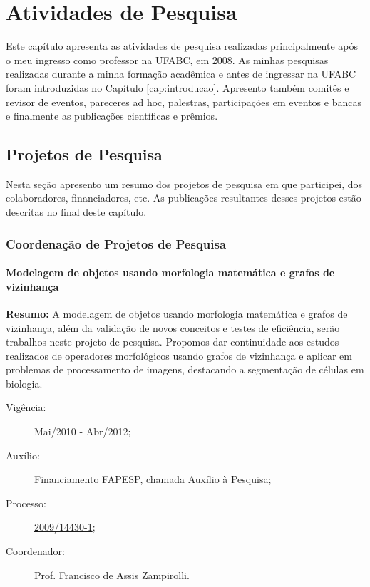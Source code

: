 
\chapter{Atividades de Pesquisa}\label{cap:pesquisa}

Este capítulo apresenta as atividades de pesquisa realizadas principalmente após o meu ingresso como professor na UFABC, em 2008. As minhas pesquisas realizadas durante a minha formação acadêmica e antes de ingressar na UFABC foram introduzidas no Capítulo \ref{cap:introducao}. Apresento também comitês e revisor de eventos, pareceres ad hoc, palestras, participações em eventos e bancas e finalmente as publicações científicas e prêmios.

\section{Projetos de Pesquisa}\label{sec:projetos}

Nesta seção apresento um resumo dos projetos de pesquisa em que participei, dos colaboradores, financiadores, etc. As publicações resultantes desses projetos estão descritas no final deste capítulo.

\subsection{Coordenação de Projetos de Pesquisa}

\subsubsection{Modelagem de objetos usando morfologia matemática e grafos de vizinhança}

\noindent\textbf{Resumo:} A modelagem de objetos usando morfologia matemática e grafos de vizinhança, além da validação de novos conceitos e testes de eficiência, serão trabalhos neste projeto de pesquisa. Propomos dar continuidade aos estudos realizados de operadores morfológicos usando grafos de vizinhança e aplicar em problemas de processamento de imagens, destacando a segmentação de células em biologia.

\begin{description}
    \item[Vigência:] Mai/2010 - Abr/2012;
    \item[Auxílio:] Financiamento FAPESP, chamada Auxílio à Pesquisa;
    \item[Processo:] \href{https://bv.fapesp.br/pt/auxilios/28430/modelagem-de-objetos-usando-morfologia-matematica-e-grafos-de-vizinhanca/}{2009/14430-1};
    \item[Coordenador:] Prof. Francisco de Assis Zampirolli.
\end{description}

